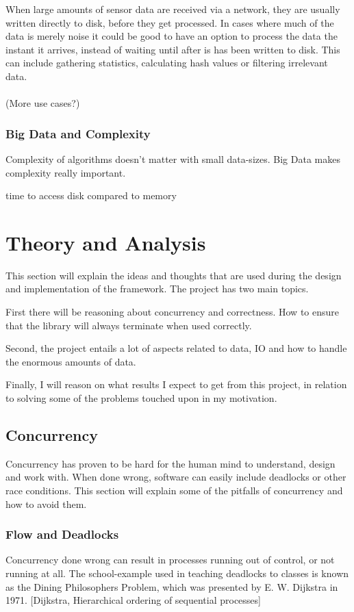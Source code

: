 \documentclass[a4paper]{article}
\begin{document}
When large amounts of sensor data are received via a network, they are usually written directly to disk, before
they get processed. In cases where much of the data is merely noise it could be good to have an option to process
the data the instant it arrives, instead of waiting until after is has been written to disk. This can include
gathering statistics, calculating hash values or filtering irrelevant data.\\\\

(More use cases?)



\subsubsection{Big Data and Complexity}
Complexity of algorithms doesn't matter with small data-sizes. Big Data makes complexity really important.

time to access disk compared to memory





\newpage
\section{Theory and Analysis}
This section will explain the ideas and thoughts that are used during the design and implementation of the framework.
The project has two main topics.

First there will be reasoning about concurrency and correctness. How to ensure that the
library will always terminate when used correctly.

Second, the project entails a lot of aspects related to data, IO and
how to handle the enormous amounts of data.

Finally, I will reason on what results I expect to get from this project, in relation to solving some of the problems touched upon in my motivation.



\subsection{Concurrency}
Concurrency has proven to be hard for the human mind to understand, design and work with. When done wrong, software can easily
include deadlocks or other race conditions. This section will explain some of the pitfalls of concurrency and how to avoid them.


\subsubsection{Flow and Deadlocks}
Concurrency done wrong can result in processes running out of control, or not running at all. The school-example used in teaching
deadlocks to classes is known as the Dining Philosophers Problem, which was presented by E. W. Dijkstra in 1971.
[Dijkstra, Hierarchical ordering of sequential processes]
\end{document}
